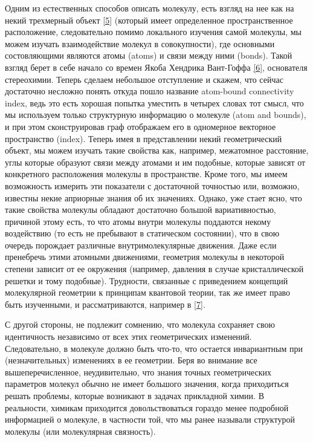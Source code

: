 \documentclass{article}
\begin{document}
Одним из естественных способов описать молекулу, есть взгляд на нее как на некий трехмерный объект \hyperlink{molecular_geometry}{[5]} (который имеет определенное пространственное расположение, следовательно помимо локального изучения самой молекулы, мы можем изучать взаимодействие молекул в совокупности), где основными состовляющими являются атомы (atoms) и связи между ними (bonds). Такой взгляд берет в себе начало со времен Якоба Хендрика Вант-Гоффа \hyperlink{first_people_stereochemistry}{[6]}, основателя стереохимии. Теперь сделаем небольшое отступление и скажем, что сейчас достаточно несложно понять откуда пошло название atom-bound connectivity index, ведь это есть хорошая попытка уместить в четырех словах тот смысл, что мы используем только структурную информацию о молекуле (atom and bounds), и при этом сконструировав граф отображаем его в одномерное векторное пространство (index). Теперь имея в представлении некий геометрический объект, мы можем изучать такие свойства как, например, межатомное расстояние, углы которые образуют связи между атомами и им подобные, которые зависят от конкретного расположения молекулы в пространстве. Кроме того, мы имеем возможность измерить эти показатели с достаточной точностью или, возможно, известны некие априорные знания об их значениях. Однако, уже стает ясно, что такие свойства молекулы обладают достаточно большой вариативностью, причиной этому есть, то что атомы внутри молекулы поддаются некому воздействию (то есть не пребывают в статическом состоянии), что в свою очередь порождает различные внутримолекулярные движения. Даже если пренебречь этими атомными движениями, геометрия молекулы в некоторой степени зависит от ее окружения (например, давления в случае кристаллической решетки и тому подобные). Трудности, связанные с приведением концепций молекулярной геометрии к принципам квантовой теории, так же имеет право быть изученными, и рассматриваются, например в \hyperlink{must_molecula_have_shape}{[7]}. 

\newpage

С другой стороны, не подлежит сомнению, что молекула сохраняет свою идентичность независимо от всех этих геометрических изменений. Следовательно, в молекуле должно быть что-то, что остается инвариантным при (незначительных) изменениях в ее геометрии. Беря во внимание все вышеперечисленное, неудивительно, что знания точных геометрических параметров молекул обычно не имеет большого значения, когда приходиться решать проблемы, которые возникают в задачах прикладной химии.
В реальности, химикам приходится довольствоваться гораздо менее подробной информацией о молекуле, в частности той, что мы ранее называли структурой молекулы (или молекулярная связность).
\end{document}
